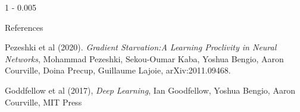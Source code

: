 \documentclass{postertheme}\usepackage[]{graphicx}\usepackage[]{color}
\begin{document}
\begin{frame}
\begin{columns}[onlytextwidth]
\begin{column}{1 \textwidth - 0.005 \textwidth}
\begin{block}{References}
\begin{thebibliography}{02}
               Pezeshki et al (2020). \textit{Gradient Starvation:A Learning Proclivity in Neural Networks},
               Mohammad Pezeshki, Sekou-Oumar Kaba, Yoshua Bengio, Aaron Courville, Doina Precup,
               Guillaume Lajoie, arXiv:2011.09468.
                                                     
               Goddfellow et al (2017), \textit{Deep Learning}, Ian Goodfellow, Yoshua Bengio,
               Aaron Courville, MIT Press
    \end{thebibliography}
    
    \end{block}
  \end{column}
\end{columns}


\end{frame}
\end{document}

